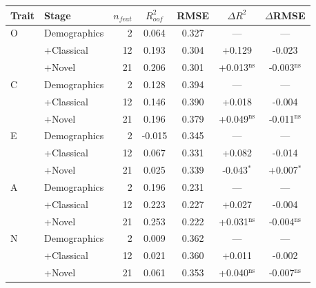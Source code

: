 \begin{tabular}{llrcccc}
\toprule
Trait & Stage & $n_{feat}$ & $R^2_{oof}$ & RMSE & $\Delta R^2$ & $\Delta$RMSE \\
\midrule
O & Demographics & 2 & 0.064 & 0.327 & --- & --- \\
 & +Classical & 12 & 0.193 & 0.304 & +0.129 & -0.023 \\
 & +Novel & 21 & 0.206 & 0.301 & +0.013$^{\mathrm{ns}}$ & -0.003$^{\mathrm{ns}}$ \\
\midrule
C & Demographics & 2 & 0.128 & 0.394 & --- & --- \\
 & +Classical & 12 & 0.146 & 0.390 & +0.018 & -0.004 \\
 & +Novel & 21 & 0.196 & 0.379 & +0.049$^{\mathrm{ns}}$ & -0.011$^{\mathrm{ns}}$ \\
\midrule
E & Demographics & 2 & -0.015 & 0.345 & --- & --- \\
 & +Classical & 12 & 0.067 & 0.331 & +0.082 & -0.014 \\
 & +Novel & 21 & 0.025 & 0.339 & -0.043$^{*}$ & +0.007$^{*}$ \\
\midrule
A & Demographics & 2 & 0.196 & 0.231 & --- & --- \\
 & +Classical & 12 & 0.223 & 0.227 & +0.027 & -0.004 \\
 & +Novel & 21 & 0.253 & 0.222 & +0.031$^{\mathrm{ns}}$ & -0.004$^{\mathrm{ns}}$ \\
\midrule
N & Demographics & 2 & 0.009 & 0.362 & --- & --- \\
 & +Classical & 12 & 0.021 & 0.360 & +0.011 & -0.002 \\
 & +Novel & 21 & 0.061 & 0.353 & +0.040$^{\mathrm{ns}}$ & -0.007$^{\mathrm{ns}}$ \\
\bottomrule
\end{tabular}
